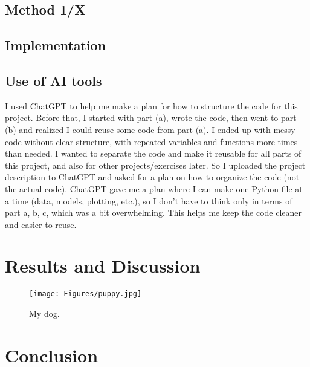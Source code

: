 \documentclass[amssymb,twocolumn,aps]{revtex4}
\begin{document}
\subsection{Method 1/X}



\subsection{Implementation}


\subsection{Use of AI tools}
	
I used ChatGPT to help me make a plan for how to structure the code for this project. Before that, I started with part (a), wrote the code, then went to part (b) and realized I could reuse some code from part (a). I ended up with messy code without clear structure, with repeated variables and functions more times than needed. I wanted to separate the code and make it reusable for all parts of this project, and also for other projects/exercises later. So I uploaded the project description to ChatGPT and asked for a plan on how to organize the code (not the actual code). ChatGPT gave me a plan where I can make one Python file at a time (data, models, plotting, etc.), so I don’t have to think only in terms of part a, b, c, which was a bit overwhelming. This helps me keep the code cleaner and easier to reuse.
	
\section{Results and Discussion}\label{section:results} 



\begin{figure}[h]
    \centering
    \texttt{[image: Figures/puppy.jpg]}
    \caption{My dog.}
    \label{fig:puppy}
\end{figure}


\section{Conclusion}\label{section:conclusion} 



\end{document}

